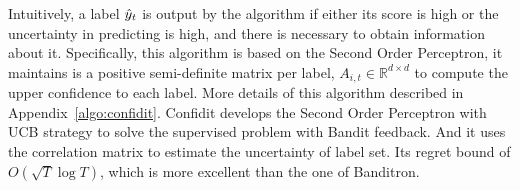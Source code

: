 Intuitively, a label $\hat{y}_t$ is output by the algorithm if either its score is high or the uncertainty in predicting is high, and there is necessary to obtain information about it.  Specifically, this algorithm is based on the Second Order Perceptron, it maintains is a positive semi-definite matrix per label, $A_{i,t}\in \mathbb{R}^{d\times d}$ to compute the upper confidence to each label. More details of this algorithm described in Appendix~\ref{algo:confidit}.  Confidit develops the Second Order Perceptron with UCB strategy to solve the supervised problem with Bandit feedback. And it uses the correlation matrix to estimate the uncertainty of label set. Its regret bound of $O(\sqrt{T}\log{T})$, which is more excellent than the one of Banditron.